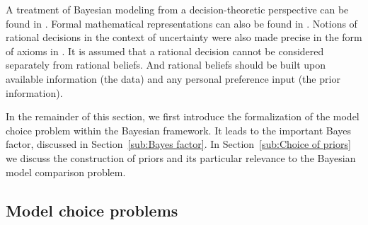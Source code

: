 A treatment of Bayesian modeling from a decision-theoretic perspective can be found in \cite{Robert:2007tc}. Formal mathematical representations can also be found in \cite[][sec.~5.1 and sec.~6.1]{Bernardo:1994vd}. Notions of rational decisions in the context of uncertainty were also made precise in the form of axioms in \cite{DeFinetti:1974tg,DeFinetti:1975ua}. It is assumed that a rational decision cannot be considered separately from rational beliefs. And rational beliefs should be built upon available information (the data) and any personal preference input (the prior information).

In the remainder of this section, we first introduce the formalization of the model choice problem within the Bayesian framework. It leads to the important Bayes factor, discussed in Section~\ref{sub:Bayes factor}. In Section~\ref{sub:Choice of priors} we discuss the construction of priors and its particular relevance to the Bayesian model comparison problem.

\subsection{Model choice problems}
\label{sub:Model choice problems}

